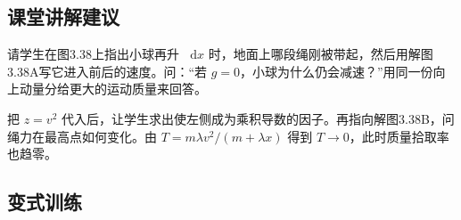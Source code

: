 \documentclass[UTF8,fontset=fandol,a4paper,11pt]{ctexart}
\newcommand{\dd}{\mathop{}\!\mathrm{d}}
\begin{document}


\subsection*{课堂讲解建议}

请学生在图3.38上指出小球再升 $\dd x$ 时，地面上哪段绳刚被带起，然后用解图3.38A写它进入前后的速度。问：“若 $g=0$，小球为什么仍会减速？”用同一份向上动量分给更大的运动质量来回答。

把 $z=v^2$ 代入后，让学生求出使左侧成为乘积导数的因子。再指向解图3.38B，问绳力在最高点如何变化。由 $T=m\lambda v^2/(m+\lambda x)$ 得到 $T\to0$，此时质量拾取率也趋零。



\subsection*{变式训练}
\end{document}
